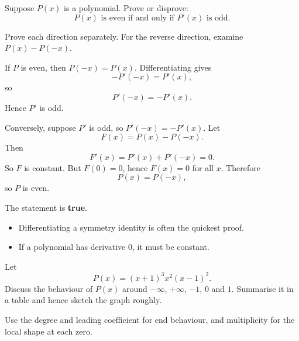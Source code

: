 
\begin{problem}
Suppose $P(x)$ is a polynomial. Prove or disprove:
\[
P(x)\text{ is even if and only if }P'(x)\text{ is odd.}
\]
\end{problem}

\begin{hintbox}
Prove each direction separately. For the reverse direction, examine $P(x)-P(-x)$.
\end{hintbox}

\begin{solution}
If $P$ is even, then $P(-x)=P(x)$. Differentiating gives
\[
-P'(-x)=P'(x),
\]
so
\[
P'(-x)=-P'(x).
\]
Hence $P'$ is odd.

Conversely, suppose $P'$ is odd, so $P'(-x)=-P'(x)$. Let
\[
F(x)=P(x)-P(-x).
\]
Then
\[
F'(x)=P'(x)+P'(-x)=0.
\]
So $F$ is constant. But $F(0)=0$, hence $F(x)=0$ for all $x$. Therefore
\[
P(x)=P(-x),
\]
so $P$ is even.

The statement is \textbf{true}.
\end{solution}

\begin{takeaways}
\begin{itemize}[leftmargin=*]
\item Differentiating a symmetry identity is often the quickest proof.
\item If a polynomial has derivative $0$, it must be constant.
\end{itemize}
\end{takeaways}

\begin{problem}
Let
\[
P(x)=(x+1)^3x^2(x-1)^2.
\]
Discuss the behaviour of $P(x)$ around $-\infty$, $+\infty$, $-1$, $0$ and $1$. Summarise it in a table and hence sketch the graph roughly.
\end{problem}

\begin{hintbox}
Use the degree and leading coefficient for end behaviour, and multiplicity for the local shape at each zero.
\end{hintbox}

